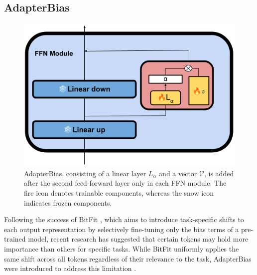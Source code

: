 

\subsection{AdapterBias}
\begin{figure}[h]
    \begin{center}
        \includegraphics[scale=0.4]{imgs/AdapterBias.png}
        \caption{ AdapterBias, consisting of a linear layer $L_\alpha$ and a vector $\mathcal{V}$, is added after the second feed-forward layer only in each FFN module. The fire icon denotes trainable components, whereas the snow icon indicates frozen components.}
        \label{fig:AdapterBias}
    \end{center}
\end{figure}
Following the success of BitFit \cite{ben-zaken-etal-2022-bitfit}, which aims to introduce task-specific shifts to each output representation by selectively fine-tuning only the bias terms of a pre-trained model, recent research has suggested that certain tokens may hold more importance than others for specific tasks. While BitFit uniformly applies the same shift across all tokens regardless of their relevance to the task, AdapterBias were introduced to address this limitation \cite{fu-etal-2022-adapterbias}.

